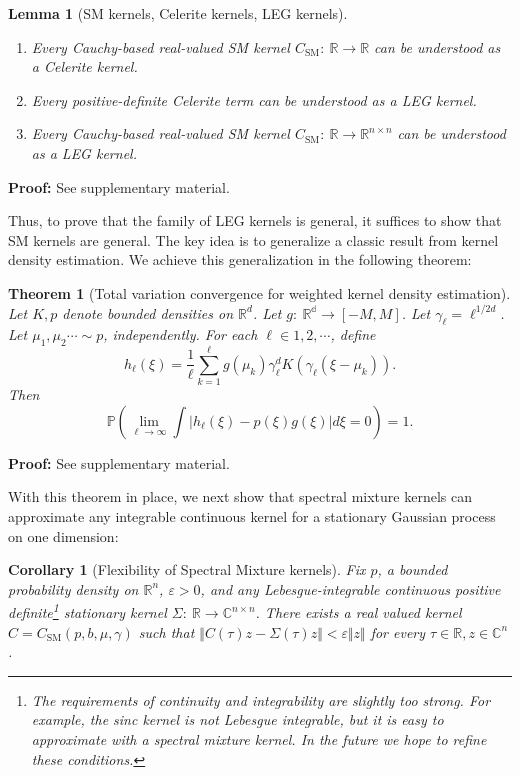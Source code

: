 \documentclass{article}
\newtheorem{lemma}{Lemma}
\newtheorem{theorem}{Theorem}
\newtheorem{coro}{Corollary}
\theoremstyle{definition}
\newcommand{\SM}{\mathrm{SM}}
\begin{document}
\begin{lemma}[SM kernels, Celerite kernels, LEG kernels] \label{lem:smareleg}
\hspace{.01in}

\begin{enumerate}
    \item Every Cauchy-based real-valued SM kernel $C_\SM:\ \mathbb{R} \rightarrow\mathbb{R}$ can be understood as a Celerite kernel.  
    \item Every positive-definite Celerite term can be understood as a LEG kernel.
    \item Every Cauchy-based real-valued SM kernel $C_\SM:\ \mathbb{R} \rightarrow\mathbb{R}^{n \times n}$ can be understood as a LEG kernel.
\end{enumerate}
\end{lemma}

{\bf Proof:} See supplementary material.  

Thus, to prove that the family of LEG kernels is general, it suffices to show that SM kernels are general.  
 The key idea is to generalize a classic result from kernel density estimation.  We achieve this generalization in the following theorem:  

\begin{theorem}[Total variation convergence for weighted kernel density estimation] \label{lem:kdereg}
Let $K,p$ denote bounded densities on $\mathbb{R}^d$.  Let $g:\ \mathbb{R^d} \rightarrow [-M,M]$.  Let $\gamma_\ell = \ell^{1/2d}$.  Let $\mu_1,\mu_2 \cdots \sim p$, independently.  For each $\ell \in 1,2,\cdots$, define  
\[
h_{\ell}(\xi) = \frac{1}{\ell} \sum_{k=1}^{\ell}g(\mu_k) \gamma^d_\ell K(\gamma_\ell(\xi - \mu_k)).
\]
Then
\[
\mathbb{P}\left(\lim_{\ell \rightarrow \infty} \int |h_{\ell}(\xi) - p(\xi)g(\xi)| d\xi  = 0\right) = 1.
\]
\end{theorem}

{\bf Proof:} See supplementary material.  

With this theorem in place, we next show that spectral mixture kernels can approximate any integrable continuous kernel for a stationary Gaussian process on one dimension: 

\begin{coro}[Flexibility of Spectral Mixture kernels]
Fix $p$, a bounded probability density on $\mathbb{R}^n$, $\varepsilon>0$, and any Lebesgue-integrable continuous positive definite\footnote{The requirements of continuity and integrability are slightly too strong.   For example, the sinc kernel is not Lebesgue integrable, but it is easy to approximate with a spectral mixture kernel.  In the future we hope to refine these conditions.}  stationary kernel $\Sigma:\ \mathbb{R} \rightarrow \mathbb{C}^{n\times n}$.   There exists a real valued kernel $C=C_\SM(p,b,\mu,\gamma)$ such that $\Vert C(\tau)z -\Sigma(\tau)z \Vert < \varepsilon \Vert z \Vert$ for every $\tau\in\mathbb{R},z\in\mathbb{C}^n$.  
\end{coro}
\end{document}
